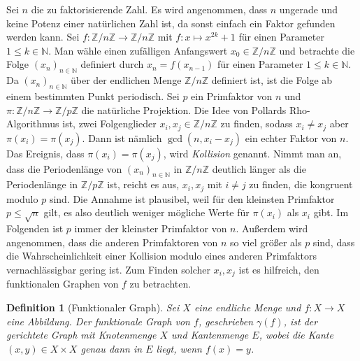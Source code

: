 \documentclass[a4paper, 10pt, ngerman]{article}
\newcommand{\N}{\mathbb{N}}
\newcommand{\Z}{\mathbb{Z}}
\newtheorem{definition}{Definition}
\begin{document}
Sei $n$ die zu faktorisierende Zahl. Es wird angenommen, dass $n$ ungerade und keine Potenz einer natürlichen Zahl ist, da sonst einfach ein Faktor gefunden werden kann. Sei $f : \Z/n\Z \to \Z/n\Z$ mit $f : x \mapsto x^{2k} + 1$ für einen Parameter $1 \le k \in \N$. Man wähle einen zufälligen Anfangswert $x_0 \in \Z/n\Z$ und betrachte die Folge $(x_n)_{n \in \N}$ definiert durch $x_n = f(x_{n - 1})$ für einen Parameter $1 \le k \in \N$. Da $(x_n)_{n \in \N}$ über der endlichen Menge $\Z/n\Z$ definiert ist, ist die Folge ab einem bestimmten Punkt periodisch. Sei $p$ ein Primfaktor von $n$ und $\pi : \Z/n\Z \to \Z/p\Z$ die natürliche Projektion. Die Idee von Pollards Rho-Algorithmus ist, zwei Folgenglieder $x_i, x_j \in \Z/n\Z$ zu finden, sodass $x_i \ne x_j$ aber $\pi(x_i) = \pi(x_j)$. Dann ist nämlich $\gcd(n, x_i - x_j)$ ein echter Faktor von $n$. Das Ereignis, dass $\pi(x_i) = \pi(x_j)$, wird \emph{Kollision} genannt. Nimmt man an, dass die Periodenlänge von $(x_n)_{n \in \N}$ in $\Z/n\Z$ deutlich länger als die Periodenlänge in $\Z/p\Z$ ist, reicht es aus, $x_i, x_j$ mit $i \ne j$ zu finden, die kongruent modulo $p$ sind. Die Annahme ist plausibel, weil für den kleinsten Primfaktor $p \le \sqrt n$ gilt, es also deutlich weniger mögliche Werte für $\pi(x_i)$ als $x_i$ gibt. Im Folgenden ist $p$ immer der kleinster Primfaktor von $n$. Außerdem wird angenommen, dass die anderen Primfaktoren von $n$ so viel größer als $p$ sind, dass die Wahrscheinlichkeit einer Kollision modulo eines anderen Primfaktors vernachlässigbar gering ist. Zum Finden solcher $x_i, x_j$ ist es hilfreich, den funktionalen Graphen von $f$ zu betrachten.

\begin{definition}[Funktionaler Graph]
    Sei $X$ eine endliche Menge und $f: X \to X$ eine Abbildung. Der funktionale Graph von $f$, geschrieben $\gamma(f)$, ist der gerichtete Graph mit Knotenmenge $X$ und Kantenmenge $E$, wobei die Kante $(x, y) \in X \times X$ genau dann in $E$ liegt, wenn $f(x) = y$.
\end{definition}
\end{document}
